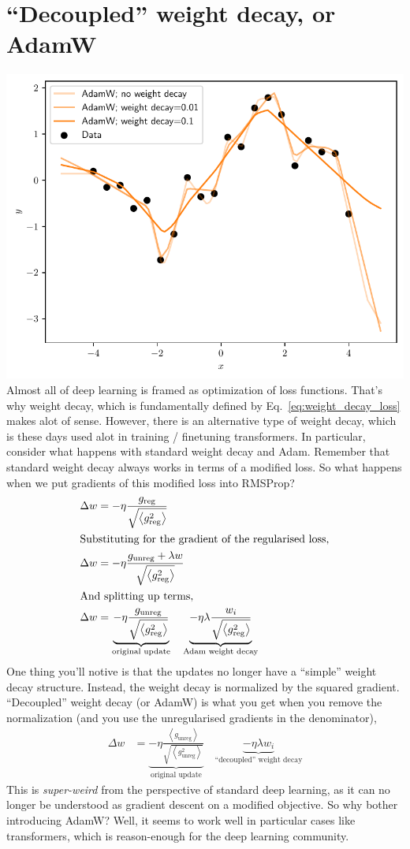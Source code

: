\documentclass{article}
\newcommand{\bracket}[3]{\left#1 #3 \right#2}
\newcommand{\ab}{\bracket{\langle}{\rangle}}
\newcommand{\0}{\mathbf{0}}
\newcommand{\greg}{g_\text{reg}}
\newcommand{\gunreg}{g_\text{unreg}}
\begin{document}
\newpage
\section{``Decoupled'' weight decay, or AdamW}
\includegraphics[width=\textwidth]{decoupled_weight_decay.pdf}
Almost all of deep learning is framed as optimization of loss functions.
That's why weight decay, which is fundamentally defined by Eq.~\eqref{eq:weight_decay_loss} makes alot of sense.
However, there is an alternative type of weight decay, which is these days used alot in training / finetuning transformers.
In particular, consider what happens with standard weight decay and Adam.
Remember that standard weight decay always works in terms of a modified loss.
So what happens when we put gradients of this modified loss into RMSProp?
\begin{align}
  \Delta w &= -\eta \frac{\greg}{\sqrt{\ab{\greg^2}}}\\
  \intertext{Substituting for the gradient of the regularised loss,}
  \Delta w &= -\eta \frac{\gunreg + \lambda w}{\sqrt{\ab{\greg^2}}}\\
  \intertext{And splitting up terms,}
  \Delta w &= \underbrace{-\eta \frac{\gunreg}{\sqrt{\ab{\greg^2}}}}_\text{original update} \quad\underbrace{- \eta \lambda \frac{w_i}{\sqrt{\ab{\greg^2}}}}_\text{Adam weight decay}
\end{align}
One thing you'll notive is that the updates no longer have a ``simple'' weight decay structure.  Instead, the weight decay is normalized by the squared gradient.
``Decoupled'' weight decay (or AdamW) is what you get when you remove the normalization (and you use the unregularised gradients in the denominator),
\begin{align}
  \Delta w &= \underbrace{-\eta \frac{\ab{\gunreg}}{\sqrt{\ab{\gunreg^2}}}}_\text{original update} \quad \underbrace{- \eta \lambda w_i}_\text{``decoupled'' weight decay}
\end{align}
This is \textit{super-weird} from the perspective of standard deep learning, as it can no longer be understood as gradient descent on a modified objective.
So why bother introducing AdamW?
Well, it seems to work well in particular cases like transformers, which is reason-enough for the deep learning community.
\end{document}
